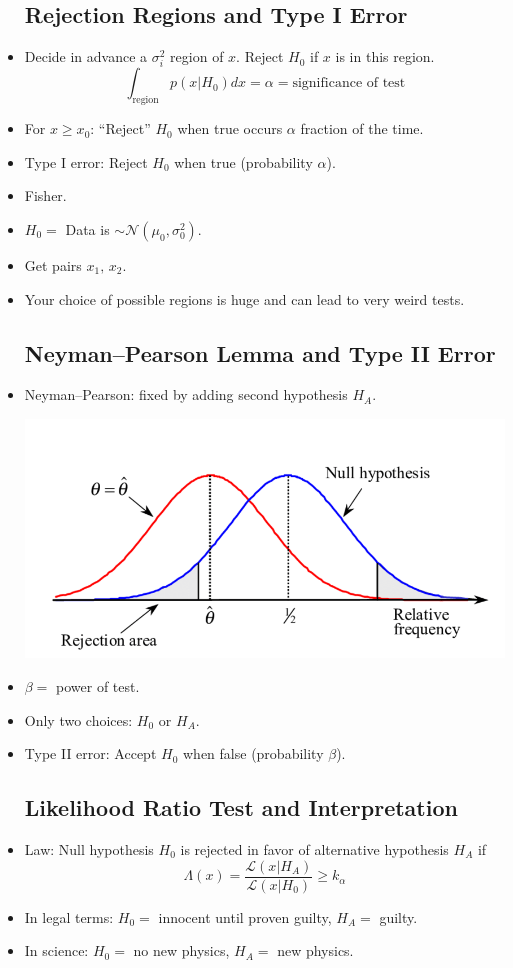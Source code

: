 \begin{itemize}
            \subsection{Rejection Regions and Type I Error}
      \item Decide in advance a $\sigma_i^2$ region of $x$. Reject $H_0$ if $x$ is in this region.
            \[
                  \int_{\text{region}} p(x|H_0) dx = \alpha = \text{significance of test}
            \]
      \item For $x \ge x_0$: “Reject” $H_0$ when true occurs $\alpha$ fraction of the time.
      \item Type I error: Reject $H_0$ when true (probability $\alpha$).
      \item Fisher.
      \item $H_0 =$ Data is $\sim \mathcal{N}(\mu_0, \sigma_0^2)$.
      \item Get pairs $x_1, \, x_2$.
      \item Your choice of possible regions is huge and can lead to very weird tests.

            \subsection{Neyman–Pearson Lemma and Type II Error}
      \item Neyman–Pearson: fixed by adding second hypothesis $H_A$.

            \includegraphics[width = 0.5\linewidth]{Images/lec14-neyman-pearson-test.png}

      \item $\beta =$ power of test.
      \item Only two choices: $H_0$ or $H_A$.
      \item Type II error: Accept $H_0$ when false (probability $\beta$).

            \subsection{Likelihood Ratio Test and Interpretation}
      \item Law: Null hypothesis $H_0$ is rejected in favor of alternative hypothesis $H_A$ if
            \[
                  \Lambda(x) = \frac{\mathcal{L}(x|H_A)}{\mathcal{L}(x|H_0)} \ge k_{\alpha}
            \]
      \item In legal terms: $H_0 =$ innocent until proven guilty, $H_A =$ guilty.
      \item In science: $H_0 =$ no new physics, $H_A =$ new physics.

\end{itemize}
